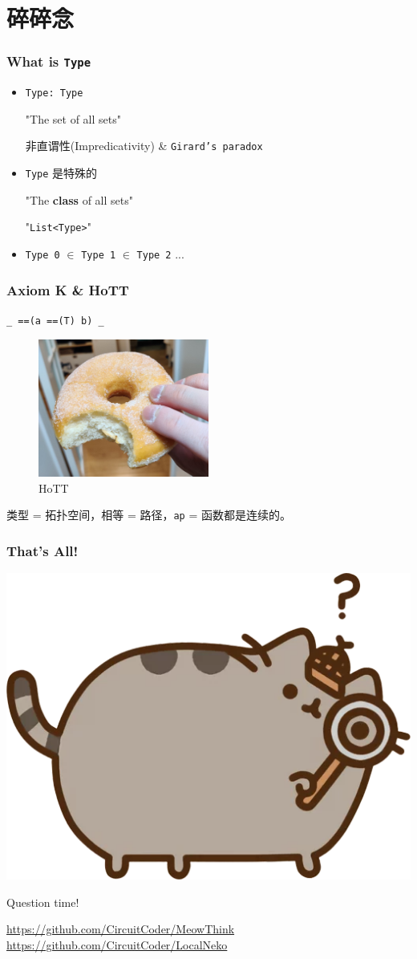 \documentclass[UTF-8]{ctexbeamer}
\begin{document}
\section{碎碎念}

\begin{frame}
  \frametitle{What is \texttt{Type}}

  \pause
  \begin{itemize}
    \item \texttt{Type: Type}

    \pause
    "The set of all sets"

    \pause
    非直谓性(Impredicativity) \& \texttt{Girard's paradox}

    \item \texttt{Type} 是特殊的

    "The \textbf{class} of all sets"

    \pause
    "\texttt{List<Type>}"

    \pause
    \item \texttt{Type 0} $\in$ \texttt{Type 1} $\in$ \texttt{Type 2} ...



  \end{itemize}
\end{frame}

\begin{frame}
  \frametitle{Axiom K \& HoTT}
  \texttt{\_ ==(a ==(T) b) \_}

  \pause

  \begin{figure}
    \includegraphics[width=0.5\textwidth]{assets/real.jpg}
    \caption{HoTT}
  \end{figure}
  类型 = 拓扑空间，相等 = 路径，\texttt{ap} = 函数都是连续的。
\end{frame}

\begin{frame}
  \frametitle{That's All!}
  \begin{center}
    \includegraphics[width=.5\textwidth]{assets/look.png}

    Question time!
  \end{center}
  \url{https://github.com/CircuitCoder/MeowThink}
  \url{https://github.com/CircuitCoder/LocalNeko}
\end{frame}
\end{document}
